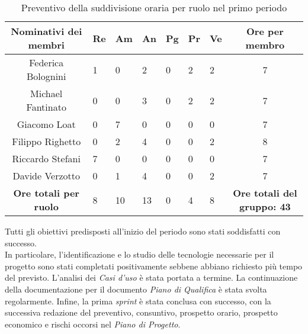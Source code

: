 \begin{table}[h!]
    \centering
    \renewcommand{\arraystretch}{1.5}
    \begin{tabularx}{\textwidth}{|c|X|X|X|X|X|X|c|}\hline
    \rowcolor[HTML]{FFD700} 
    \textbf{Nominativi dei membri} & \textbf{Re} & \textbf{Am} & \textbf{An} & \textbf{Pg} & \textbf{Pr} & \textbf{Ve} & \textbf{Ore per membro} \\ \hline
    Federica Bolognini  & 1 & 0 & 2 & 0 & 2 & 2 & 7 \\ \hline
    Michael Fantinato   & 0 & 0 & 3 & 0 & 2 & 2 & 7 \\ \hline
    Giacomo Loat        & 0 & 7 & 0 & 0 & 0 & 0 & 7 \\ \hline
    Filippo Righetto    & 0 & 2 & 4 & 0 & 0 & 2 & 8 \\ \hline
    Riccardo Stefani    & 7 & 0 & 0 & 0 & 0 & 0 & 7 \\ \hline
    Davide Verzotto     & 0 & 1 & 4 & 0 & 0 & 2 & 7 \\ \hline
    \rowcolor[HTML]{FFD700} 
    \textbf{Ore totali per ruolo} & 8 & 10 & 13 & 0 & 4 & 8 & \textbf{Ore totali del gruppo: 43} \\ \hline
    \end{tabularx}
    \caption{Preventivo della suddivisione oraria per ruolo nel primo periodo}
\end{table}

Tutti gli obiettivi predisposti all'inizio del periodo sono stati soddisfatti con successo.\\
In particolare, l'identificazione e lo studio delle tecnologie necessarie per il progetto sono stati completati positivamente sebbene abbiano richiesto più tempo del previsto. L'analisi dei \textit{Casi d'uso} è stata portata a termine. La continuazione della documentazione per il documento \textit{Piano di Qualifica} è stata svolta regolarmente. Infine, la prima {\emph{sprint}} è stata conclusa con successo, con la successiva redazione del preventivo, consuntivo, prospetto orario, prospetto economico e rischi occorsi nel \textit{Piano di Progetto}.

\newpage
